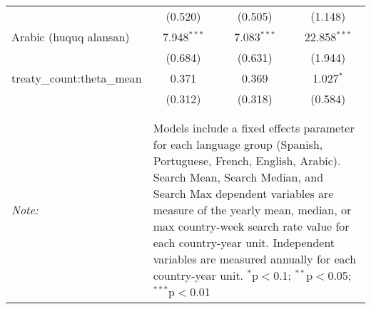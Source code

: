 \begin{table}[!htbp]
\begin{tabular}{@{\extracolsep{5pt}}lccc}
  & (0.520) & (0.505) & (1.148) \\ 
  Arabic (huquq alansan) & 7.948$^{***}$ & 7.083$^{***}$ & 22.858$^{***}$ \\ 
  & (0.684) & (0.631) & (1.944) \\ 
  treaty\_count:theta\_mean & 0.371 & 0.369 & 1.027$^{*}$ \\ 
  & (0.312) & (0.318) & (0.584) \\ 
 \hline \\[-1.8ex] 
\hline 
\hline \\[-1.8ex] 
\textit{Note:}  & \multicolumn{3}{l}{\parbox[t]{8cm}{Models include a fixed effects parameter for each language group (Spanish, Portuguese, French, English, Arabic). Search Mean, Search Median, and Search Max dependent variables are measure of the yearly mean, median, or max country-week search rate value for each country-year unit. Independent variables are measured annually for each country-year unit. $^{*}$p$<$0.1; $^{**}$p$<$0.05; $^{***}$p$<$0.01}} \\ 
\end{tabular} 
\end{table} 
